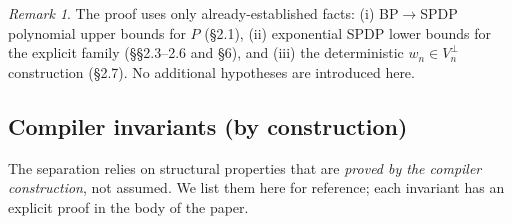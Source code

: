 \documentclass[12pt]{article}
\theoremstyle{definition}
\theoremstyle{definition}
\theoremstyle{remark}
\newtheorem{remark}{Remark}
\theoremstyle{remark}
\begin{document}
\begin{remark}
The proof uses only already-established facts: (i) BP$\to$SPDP polynomial upper bounds for $P$ (\S2.1), (ii) exponential SPDP lower bounds for the explicit family (\S\S2.3--2.6 and \S6), and (iii) the deterministic $w_n\in V_n^{\perp}$ construction (\S2.7). No additional hypotheses are introduced here.
\end{remark}

\subsection{Compiler invariants (by construction)}
\label{sec:compiler-invariants}

The separation relies on structural properties that are \emph{proved by
the compiler construction}, not assumed.  We list them here for reference;
each invariant has an explicit proof in the body of the paper.
\end{document}
